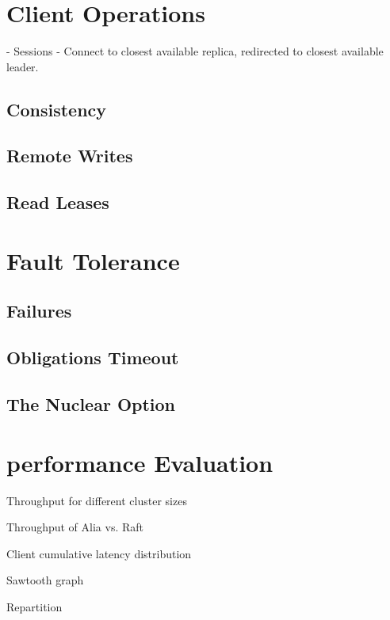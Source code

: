 \section{Client Operations}

- Sessions
- Connect to closest available replica, redirected to closest available leader.

\subsection{Consistency}

\subsection{Remote Writes}

\subsection{Read Leases}

\section{Fault Tolerance}

\subsection{Failures}

\subsection{Obligations Timeout}

\subsection{The Nuclear Option}

\section{performance Evaluation}

Throughput for different cluster sizes

Throughput of Alia vs. Raft

Client cumulative latency distribution

Sawtooth graph

Repartition
